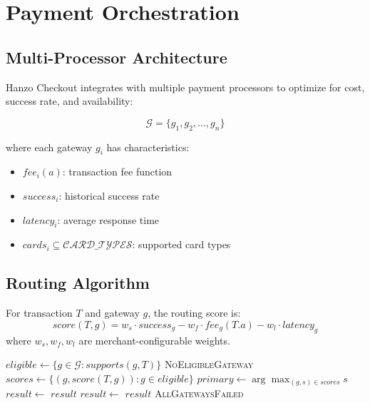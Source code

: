 \section{Payment Orchestration}


\subsection{Multi-Processor Architecture}

Hanzo Checkout integrates with multiple payment processors to optimize for cost, success rate, and availability:

\begin{equation}
\mathcal{G} = \{g_1, g_2, \ldots, g_n\}
\end{equation}

where each gateway $g_i$ has characteristics:
\begin{itemize}
    \item $fee_i(a)$: transaction fee function
    \item $success_i$: historical success rate
    \item $latency_i$: average response time
    \item $cards_i \subseteq \mathcal{CARD\_TYPES}$: supported card types
\end{itemize}

\subsection{Routing Algorithm}

\begin{definition}
For transaction $T$ and gateway $g$, the routing score is:
\begin{equation}
score(T, g) = w_s \cdot success_g - w_f \cdot fee_g(T.a) - w_l \cdot latency_g
\end{equation}
where $w_s, w_f, w_l$ are merchant-configurable weights.
\end{definition}

\begin{algorithm}
\caption{Intelligent Payment Routing}
\begin{algorithmic}[1]
    \State $eligible \gets \{g \in \mathcal{G} : supports(g, T)\}$
        \State \Return \textsc{NoEligibleGateway}
    \EndIf
    \State $scores \gets \{(g, score(T, g)) : g \in eligible\}$
    \State $primary \gets \arg\max_{(g,s) \in scores} s$
    \State $result \gets$ 
        \State \Return $result$
    \EndIf
    \State {}
        \State $result \gets$ 
            \State \Return $result$
        \EndIf
    \EndFor
    \State \Return \textsc{AllGatewaysFailed}
\EndFunction
\end{algorithmic}
\end{algorithm}

